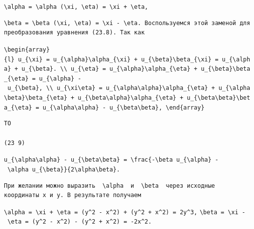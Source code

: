 \documentclass[
  ukrainian,
]{article}
\begin{document}
\texttt{\textbackslash{}alpha\ =\ \textbackslash{}alpha\ (\textbackslash{}xi,\ \textbackslash{}eta)\ =\ \textbackslash{}xi\ +\ \textbackslash{}eta,}

\begin{verbatim}
\beta = \beta (\xi, \eta) = \xi - \eta. Воспользуемся этой заменой для преобразования уравнения (23.8). Так как
\end{verbatim}

\texttt{\textbackslash{}begin\{array\}\{l\}\ u\_\{\textbackslash{}xi\}\ =\ u\_\{\textbackslash{}alpha\}\textbackslash{}alpha\_\{\textbackslash{}xi\}\ +\ u\_\{\textbackslash{}beta\}\textbackslash{}beta\_\{\textbackslash{}xi\}\ =\ u\_\{\textbackslash{}alpha\}\ +\ u\_\{\textbackslash{}beta\}.\ \textbackslash{}\textbackslash{}\ u\_\{\textbackslash{}eta\}\ =\ u\_\{\textbackslash{}alpha\}\textbackslash{}alpha\_\{\textbackslash{}eta\}\ +\ u\_\{\textbackslash{}beta\}\textbackslash{}beta\_\{\textbackslash{}eta\}\ =\ u\_\{\textbackslash{}alpha\}\ -\ u\_\{\textbackslash{}beta\},\ \textbackslash{}\textbackslash{}\ u\_\{\textbackslash{}xi\textbackslash{}eta\}\ =\ u\_\{\textbackslash{}alpha\textbackslash{}alpha\}\textbackslash{}alpha\_\{\textbackslash{}eta\}\ +\ u\_\{\textbackslash{}alpha\textbackslash{}beta\}\textbackslash{}beta\_\{\textbackslash{}eta\}\ +\ u\_\{\textbackslash{}beta\textbackslash{}alpha\}\textbackslash{}alpha\_\{\textbackslash{}eta\}\ +\ u\_\{\textbackslash{}beta\textbackslash{}beta\}\textbackslash{}beta\_\{\textbackslash{}eta\}\ =\ u\_\{\textbackslash{}alpha\textbackslash{}alpha\}\ -\ u\_\{\textbackslash{}beta\textbackslash{}beta\},\ \textbackslash{}end\{array\}}

\begin{verbatim}
TO

(23 9)
\end{verbatim}

\texttt{u\_\{\textbackslash{}alpha\textbackslash{}alpha\}\ -\ u\_\{\textbackslash{}beta\textbackslash{}beta\}\ =\ \textbackslash{}frac\{-\textbackslash{}beta\ u\_\{\textbackslash{}alpha\}\ -\ \textbackslash{}alpha\ u\_\{\textbackslash{}beta\}\}\{2\textbackslash{}alpha\textbackslash{}beta\}.}

\begin{verbatim}
При желании можно выразить  \alpha  и  \beta  через исходные координаты x и y. В результате получаем
\end{verbatim}

\texttt{\textbackslash{}alpha\ =\ \textbackslash{}xi\ +\ \textbackslash{}eta\ =\ (y\^{}2\ -\ x\^{}2)\ +\ (y\^{}2\ +\ x\^{}2)\ =\ 2y\^{}3,}
\texttt{\textbackslash{}beta\ =\ \textbackslash{}xi\ -\ \textbackslash{}eta\ =\ (y\^{}2\ -\ x\^{}2)\ -\ (y\^{}2\ +\ x\^{}2)\ =\ -2x\^{}2.}
\end{document}
